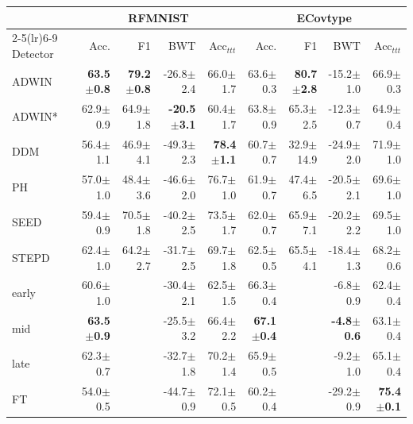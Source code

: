 \begin{tabular}{lrrrrrrrr}
\toprule
 & \multicolumn{4}{c}{RFMNIST} & \multicolumn{4}{c}{ECovtype} \\
\cmidrule(lr){2-5}\cmidrule(lr){6-9}
Detector & Acc. & F1 & BWT & Acc$_{ttt}$ & Acc. & F1 & BWT & Acc$_{ttt}$ \\
\midrule
ADWIN & \textbf{63.5\tiny{$\pm$0.8}} & \textbf{79.2\tiny{$\pm$0.8}} & -26.8\tiny{$\pm$2.4} & 66.0\tiny{$\pm$1.7} & 63.6\tiny{$\pm$0.3} & \textbf{80.7\tiny{$\pm$2.8}} & -15.2\tiny{$\pm$1.0} & 66.9\tiny{$\pm$0.3} \\
ADWIN* & 62.9\tiny{$\pm$0.9} & 64.9\tiny{$\pm$1.8} & \textbf{-20.5\tiny{$\pm$3.1}} & 60.4\tiny{$\pm$1.7} & 63.8\tiny{$\pm$0.9} & 65.3\tiny{$\pm$2.5} & -12.3\tiny{$\pm$0.7} & 64.9\tiny{$\pm$0.4} \\
DDM & 56.4\tiny{$\pm$1.1} & 46.9\tiny{$\pm$4.1} & -49.3\tiny{$\pm$2.3} & \textbf{78.4\tiny{$\pm$1.1}} & 60.7\tiny{$\pm$0.7} & 32.9\tiny{$\pm$14.9} & -24.9\tiny{$\pm$2.0} & 71.9\tiny{$\pm$1.0} \\
PH & 57.0\tiny{$\pm$1.0} & 48.4\tiny{$\pm$3.6} & -46.6\tiny{$\pm$2.0} & 76.7\tiny{$\pm$1.0} & 61.9\tiny{$\pm$0.7} & 47.4\tiny{$\pm$6.5} & -20.5\tiny{$\pm$2.1} & 69.6\tiny{$\pm$1.0} \\
SEED & 59.4\tiny{$\pm$0.9} & 70.5\tiny{$\pm$1.8} & -40.2\tiny{$\pm$2.5} & 73.5\tiny{$\pm$1.7} & 62.0\tiny{$\pm$0.7} & 65.9\tiny{$\pm$7.1} & -20.2\tiny{$\pm$2.2} & 69.5\tiny{$\pm$1.0} \\
STEPD & 62.4\tiny{$\pm$1.0} & 64.2\tiny{$\pm$2.7} & -31.7\tiny{$\pm$2.5} & 69.7\tiny{$\pm$1.8} & 62.5\tiny{$\pm$0.5} & 65.5\tiny{$\pm$4.1} & -18.4\tiny{$\pm$1.3} & 68.2\tiny{$\pm$0.6} \\
\midrule
early & 60.6\tiny{$\pm$1.0} &  & -30.4\tiny{$\pm$2.1} & 62.5\tiny{$\pm$1.5} & 66.3\tiny{$\pm$0.4} &  & -6.8\tiny{$\pm$0.9} & 62.4\tiny{$\pm$0.4} \\
mid & \textbf{63.5\tiny{$\pm$0.9}} &  & -25.5\tiny{$\pm$3.2} & 66.4\tiny{$\pm$2.2} & \textbf{67.1\tiny{$\pm$0.4}} &  & \textbf{-4.8\tiny{$\pm$0.6}} & 63.1\tiny{$\pm$0.4} \\
late & 62.3\tiny{$\pm$0.7} &  & -32.7\tiny{$\pm$1.8} & 70.2\tiny{$\pm$1.4} & 65.9\tiny{$\pm$0.5} &  & -9.2\tiny{$\pm$1.0} & 65.1\tiny{$\pm$0.4} \\
\midrule
FT & 54.0\tiny{$\pm$0.5} &  & -44.7\tiny{$\pm$0.9} & 72.1\tiny{$\pm$0.5} & 60.2\tiny{$\pm$0.4} &  & -29.2\tiny{$\pm$0.9} & \textbf{75.4\tiny{$\pm$0.1}} \\
\bottomrule
\end{tabular}
